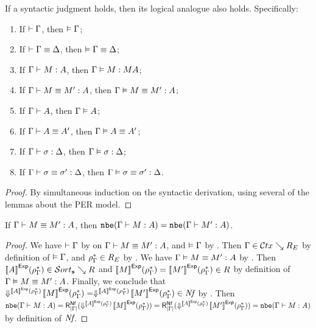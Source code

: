 \begin{theorem}
  \label{lem:fundamental-comp}
  If a syntactic judgment holds, then its logical analogue also holds.  Specifically:
  \begin{enumerate}
  \item If $\vdash \Gamma$, then $\vDash \Gamma$;
  \item If $\vdash \Gamma \equiv \Delta$, then $\vDash \Gamma \equiv \Delta$;
  \item If $\Gamma \vdash M : A$, then $\Gamma \vDash M : M A$;
  \item If $\Gamma \vdash M \equiv M' : A$, then $\Gamma \vDash M \equiv M' : A$;
  \item If $\Gamma \vdash A$, then $\Gamma \vDash A$;
  \item If $\Gamma \vdash A \equiv A'$, then $\Gamma \vDash A \equiv A'$;
  \item If $\Gamma \vdash \sigma : \Delta$, then $\Gamma \vDash \sigma : \Delta$;
  \item If $\Gamma \vdash \sigma \equiv \sigma' : \Delta$, then $\Gamma \vDash \sigma \equiv \sigma' : \Delta$.
  \end{enumerate}
\end{theorem}
\begin{proof}
  By simultaneous induction on the syntactic derivation, using several of the lemmas about the PER model.
\end{proof}

\begin{theorem}
  If $\Gamma \vdash M \equiv M' : A$, then $\texttt{nbe}(\Gamma \vdash M : A) = \texttt{nbe}(\Gamma \vdash M' : A)$.
\end{theorem}
\begin{proof}
  We have $\vdash \Gamma$ by  on $\Gamma \vdash M \equiv M' : A$, and $\vDash \Gamma$ by .
  Then $\Gamma \in \mathcal{C}tx \searrow R_E$ by definition of $\vDash \Gamma$, and $\rho^*_{\Gamma} \in R_E$ by .
  We have $\Gamma \vDash M \equiv M' : A$ by .
  Then $\evalexpfunc A {\denvinit \Gamma} \in \persort \searrow R$ and ${[\![M]\!]}^{\mathsf{Exp}}(\rho^*_{\Gamma}) = {[\![M']\!]}^{\mathsf{Exp}}(\rho^*_{\Gamma}) \in R$ by definition of $\Gamma \vDash M \equiv M' : A$.
  Finally, we conclude that $\dreify {\evalexpfunc A {\denvinit \Gamma}} {\evalexpfunc M {\denvinit \Gamma}} = \dreify {\evalexpfunc A {\denvinit \Gamma}} {\evalexpfunc {M'} {\denvinit \Gamma}} \in \pernf$ by .
  Then $\nbeexpfunc \Gamma M A = \rbnffunc[|\Gamma|] {\dreify {\evalexpfunc A {\denvinit \Gamma}} {\evalexpfunc M {\denvinit \Gamma}}} = \rbnffunc[|\Gamma|] {\dreify {\evalexpfunc A {\denvinit \Gamma}} {\evalexpfunc {M'} {\denvinit \Gamma}}} = \nbeexpfunc \Gamma M A$ by definition of ${\normalfont\textit{Nf}}$.
\end{proof}



